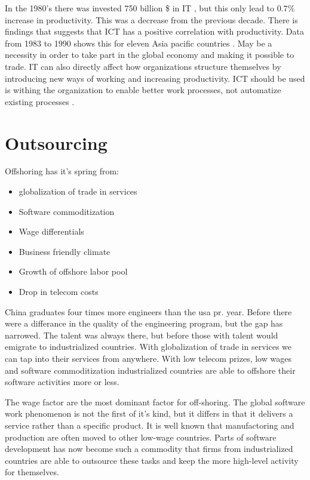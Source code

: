 In the 1980's there was invested 750 billion \$ in IT \cite{ca:ieeg}, but this only lead to \(0.7\%\) increase in productivity. This was a decrease from the previous decade.
There is findings that suggests that ICT has a positive correlation with productivity. Data from 1983 to 1990 shows this for eleven Asia pacific countries \cite{ca:ieeg}. May be a necessity in order to take part in the global economy and making it possible to trade. IT can also directly affect how organizations structure themselves by introducing new ways of working and increasing productivity.
ICT should be used is withing the organization to enable better work processes, not automatize existing processes \cite{mh:rw}. 



\section{Outsourcing}
Offshoring has it's spring from:

\begin{itemize}
\item globalization of trade in services
\item Software commoditization
\item Wage differentials
\item Business friendly climate 
\item Growth of offshore labor pool
\item Drop in telecom costs
\end{itemize}

China graduates four times more engineers than the \gls{usa} pr. year. 
Before there were a differance in the quality of the engineering program, but the gap has narrowed. 
The talent was always there, but before those with talent would emigrate to industrialized countries. 
With globalization of trade in services we can tap into their services from anywhere. 
With low telecom prizes, low wages and software commoditization industrialized countries are able to offshore their software activities more or less. 

The wage factor are the most dominant factor for off-shoring.
The global software work phenomenon is not the first of it's kind, but it differs in that it delivers a service rather than a specific product. 
It is well known that manufactoring and production are often moved to other low-wage countries.
Parts of software development has now become such a commodity that firms from industrialized countries are able to outsource these tasks and keep the more high-level activity for themselves. 

